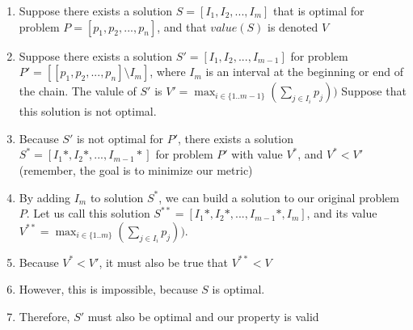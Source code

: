 \documentclass[landscape]{slides}
\begin{document}
\begin{slide} %
	\begin{enumerate}
		\item Suppose there exists a solution 
		$S = [I_1, I_2, ..., I_m]$ that is optimal for problem 
		$P = [p_1, p_2, ..., p_n]$, and that $value(S)$ is denoted $V$
		\item Suppose there exists a solution $S' = [I_1, I_2, ..., I_{m-1}]$ for
		problem $P'= [[p_1, p_2, ..., p_n] \setminus I_m]$, where $I_m$ is an
		interval at the beginning or end of the chain. The valule of $S'$ is
		$V' = \max_{i\in\{1..m-1\}}(\sum_{j \in{I_i}} p_j))$ 
		Suppose that this solution is not optimal.
		\item Because $S'$ is not optimal for $P'$, there exists a solution $S^* =
		[I_1*, I_2*, ..., I_{m-1}*]$ for problem $P'$ with value $V^*$, and $V^* <
		V'$ \\(remember, the goal is to minimize our metric) 

		\item By adding $I_m$ to solution $S^*$, we can build a solution to our
		original problem $P$. Let us call this solution $S^{**} = [I_1*, I_2*, ...,
		I_{m-1}*, I_m]$, and its value $V^{**} = \max_{i\in\{1..m\}}(\sum_{j
		\in{I_i}} p_j))$.

		\item Because $V^{*} < V'$, it must also be true that $V^{**} < V$

		\item However, this is impossible, because $S$ is optimal. 
		\item Therefore, $S'$ must also be optimal and our property is valid
	\end{enumerate}
\end{slide}
\end{document}
